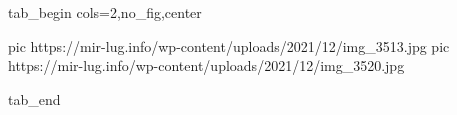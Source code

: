  
 
 
 
 


\ifcmt
  tab_begin cols=2,no_fig,center

     pic https://mir-lug.info/wp-content/uploads/2021/12/img_3513.jpg
		 pic https://mir-lug.info/wp-content/uploads/2021/12/img_3520.jpg

  tab_end
\fi
